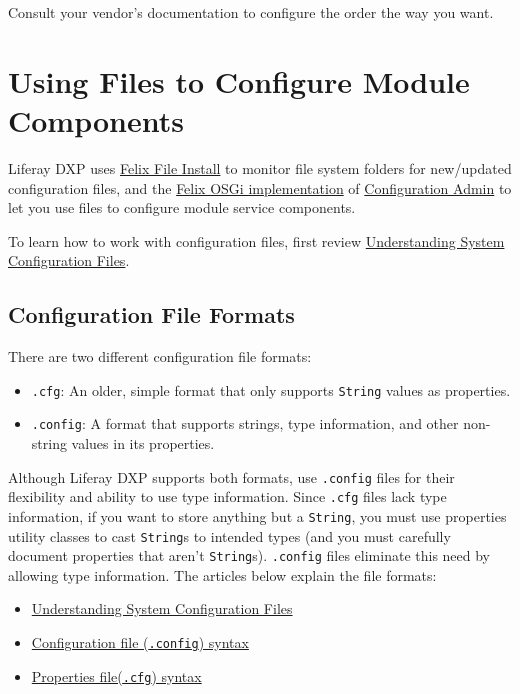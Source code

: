 Consult your vendor's documentation to configure the order the way you
want.

\chapter{Using Files to Configure Module
Components}\label{using-files-to-configure-module-components}

Liferay DXP uses
\href{http://felix.apache.org/documentation/subprojects/apache-felix-file-install.html}{Felix
File Install} to monitor file system folders for new/updated
configuration files, and the \href{http://felix.apache.org/}{Felix OSGi
implementation} of
\href{http://felix.apache.org/documentation/subprojects/apache-felix-config-admin.html}{Configuration
Admin} to let you use files to configure module service components.

To learn how to work with configuration files, first review
\href{/docs/7-1/user/-/knowledge_base/u/understanding-system-configuration-files}{Understanding
System Configuration Files}.

\section{Configuration File Formats}\label{configuration-file-formats}

There are two different configuration file formats:

\begin{itemize}
\tightlist
\item
  \texttt{.cfg}: An older, simple format that only supports
  \texttt{String} values as properties.
\item
  \texttt{.config}: A format that supports strings, type information,
  and other non-string values in its properties.
\end{itemize}

Although Liferay DXP supports both formats, use \texttt{.config} files
for their flexibility and ability to use type information. Since
\texttt{.cfg} files lack type information, if you want to store anything
but a \texttt{String}, you must use properties utility classes to cast
\texttt{String}s to intended types (and you must carefully document
properties that aren't \texttt{String}s). \texttt{.config} files
eliminate this need by allowing type information. The articles below
explain the file formats:

\begin{itemize}
\tightlist
\item
  \href{/docs/7-1/user/-/knowledge_base/u/understanding-system-configuration-files}{Understanding
  System Configuration Files}
\item
  \href{https://sling.apache.org/documentation/bundles/configuration-installer-factory.html\#configuration-files-config}{Configuration
  file (\texttt{.config}) syntax}
\item
  \href{https://sling.apache.org/documentation/bundles/configuration-installer-factory.html\#property-files-cfg}{Properties
  file(\texttt{.cfg}) syntax}
\end{itemize}

